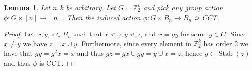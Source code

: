 \documentclass[10 pt]{amsart}
\theoremstyle{plain}
\newtheorem{lem}[thm]{Lemma}
\newtheorem{cor}[thm]{Corollary}
\theoremstyle{definition}
\theoremstyle{remark}
\numberwithin{equation}{section}
\newcommand\BBZ{{\mathbb Z}}
\def\Stab{\operatorname{Stab}}
\begin{document}
\iffalse

\begin{lem}
\label{lem:order_2_CCT}
Let $n,k$ be arbitrary. Let $G = \BBZ_2^k$ and pick any group action $\phi:G\times [n] \rightarrow [n].$ Then the induced action $\phi:G \times B_n \rightarrow B_n$ is CCT.
\end{lem}

\begin{proof}
Let $x,y,z\in B_n$ such that $x \lessdot z, y \lessdot z$, and  $x = gy$ for some $g\in G$.  Since $x\ne y$ we have $z=x\cup y$.  Furthermore, since every element in $\BBZ_2^k$ has order 2 we have that $gy = g^2x = x$ and thus $gz = gx\cup gy = y\cup x = z$, hence $g\in\Stab(z)$ and thus $\phi$ is CCT.
\end{proof}
%


\end{document}
